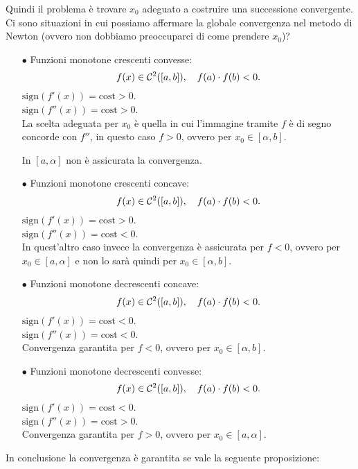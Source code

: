 Quindi il problema è trovare $x_0$ adeguato a costruire una successione 
convergente. Ci sono situazioni in cui possiamo affermare la globale
convergenza nel metodo di Newton (ovvero non dobbiamo preoccuparci di come
prendere $x_0$)? 
\begin{itemize}
\item[$\bullet$]Funzioni monotone crescenti convesse:\[
f(x) \in \mathcal{C}^2([a,b]), \quad f(a) \cdot f(b) < 0.
\]
$\textrm{sign}(f'(x)) = \textrm{cost} > 0$.\\
$\textrm{sign}(f''(x)) = \textrm{cost} > 0$.\\

La scelta adeguata per $x_0$ è quella in cui l'immagine tramite $f$ è
di segno concorde con $f''$, in questo caso $f > 0$, ovvero per 
$x_0 \in [\alpha, b]$.

In $[a, \alpha]$ non è assicurata la convergenza.

\item[$\bullet$]Funzioni monotone crescenti concave:\[
f(x) \in \mathcal{C}^2([a,b]), \quad f(a) \cdot f(b) < 0.
\]
$\textrm{sign}(f'(x)) = \textrm{cost} > 0$.\\
$\textrm{sign}(f''(x)) = \textrm{cost} < 0$.\\

In quest'altro caso invece la convergenza è assicurata per $f < 0$, ovvero per 
$x_0 \in [a, \alpha]$ e non lo
sarà quindi per $x_0 \in [\alpha, b]$.

\item[$\bullet$]Funzioni monotone decrescenti concave:\[
f(x) \in \mathcal{C}^2([a,b]), \quad f(a) \cdot f(b) < 0.
\]
$\textrm{sign}(f'(x)) = \textrm{cost} < 0$.\\
$\textrm{sign}(f''(x)) = \textrm{cost} < 0$.\\

Convergenza garantita per $f < 0$, ovvero per $x_0 \in [\alpha, b]$.

\item[$\bullet$]Funzioni monotone decrescenti convesse:\[
f(x) \in \mathcal{C}^2([a,b]), \quad f(a) \cdot f(b) < 0.
\]
$\textrm{sign}(f'(x)) = \textrm{cost} < 0$.\\
$\textrm{sign}(f''(x)) = \textrm{cost} > 0$.\\

Convergenza garantita per $f > 0$, ovvero per $x_0 \in [a, \alpha]$.
\end{itemize}

In conclusione la convergenza è garantita se vale la seguente proposizione:


